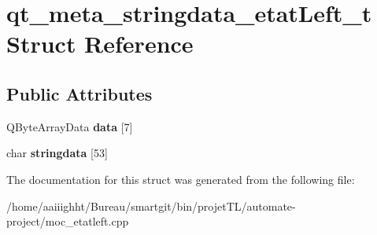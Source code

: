 \hypertarget{structqt__meta__stringdata__etat_left__t}{\section{qt\-\_\-meta\-\_\-stringdata\-\_\-etat\-Left\-\_\-t Struct Reference}
\label{structqt__meta__stringdata__etat_left__t}
}
\subsection*{Public Attributes}
\begin{DoxyCompactItemize}
\item 
\hypertarget{structqt__meta__stringdata__etat_left__t_ad16d3d553795be640d70bc3f777ad44c}{Q\-Byte\-Array\-Data {\bfseries data} \mbox{[}7\mbox{]}}\label{structqt__meta__stringdata__etat_left__t_ad16d3d553795be640d70bc3f777ad44c}

\item 
\hypertarget{structqt__meta__stringdata__etat_left__t_a091074801566ffe89515b5a1b998903e}{char {\bfseries stringdata} \mbox{[}53\mbox{]}}\label{structqt__meta__stringdata__etat_left__t_a091074801566ffe89515b5a1b998903e}

\end{DoxyCompactItemize}


The documentation for this struct was generated from the following file\-:\begin{DoxyCompactItemize}
\item 
/home/aaiiighht/\-Bureau/smartgit/bin/projet\-T\-L/automate-\/project/moc\-\_\-etatleft.\-cpp\end{DoxyCompactItemize}
